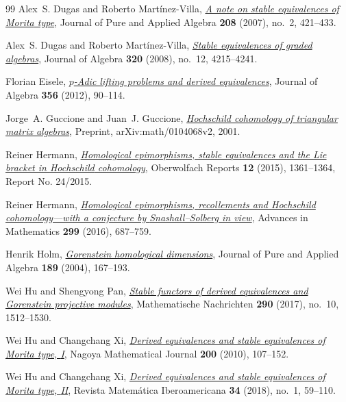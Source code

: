 \documentclass[12pt,a4paper,english,reqno]{amsart}
\numberwithin{equation}{section}
\theoremstyle{plain}
\theoremstyle{definition}
\begin{document}
\begin{thebibliography}{99}
Alex~S. Dugas and Roberto Mart{\'i}nez-Villa,
  \emph{\href{https://doi.org/10.1016/j.jpaa.2006.01.007}{A note on stable
  equivalences of {Morita} type}}, Journal of Pure and Applied Algebra
  \textbf{208} (2007), no.~2, 421--433.

Alex~S. Dugas and Roberto Mart{\'i}nez-Villa,
  \emph{\href{https://doi.org/10.1016/j.jalgebra.2008.09.014}{Stable
  equivalences of graded algebras}}, Journal of Algebra \textbf{320} (2008),
  no.~12, 4215--4241.

Florian Eisele,
  \emph{\href{https://doi.org/10.1016/j.jalgebra.2012.01.015}
  {$p$-Adic lifting problems and derived equivalences}},
  Journal of Algebra \textbf{356} (2012), 90--114.

Jorge~A. Guccione and Juan~J. Guccione,
  \emph{\href{https://arxiv.org/abs/math/0104068}{Hochschild cohomology of
  triangular matrix algebras}}, Preprint, arXiv:math/0104068v2, 2001.

Reiner Hermann, \emph{\href{https://doi.org/10.4171/OWR/2015/24}{Homological
  epimorphisms, stable equivalences and the {Lie} bracket in {Hochschild}
  cohomology}}, Oberwolfach Reports \textbf{12} (2015), 1361--1364, Report No.
  24/2015.

Reiner Hermann, \emph{\href{https://doi.org/10.1016/j.aim.2016.05.022}{Homological
  epimorphisms, recollements and {Hochschild} cohomology---with a conjecture by
  {Snashall--Solberg} in view}}, Advances in Mathematics \textbf{299} (2016),
  687--759.

Henrik Holm, \emph{\href{https://doi.org/10.1016/j.jpaa.2003.11.007}{Gorenstein
  homological dimensions}}, Journal of Pure and Applied Algebra \textbf{189}
  (2004), 167--193.

Wei Hu and Shengyong Pan,
  \emph{\href{https://doi.org/10.1002/mana.201600179}{Stable functors of
  derived equivalences and {Gorenstein} projective modules}}, Mathematische
  Nachrichten \textbf{290} (2017), no.~10, 1512--1530.

Wei Hu and Changchang Xi,
  \emph{\href{https://doi.org/10.1215/00277630-2010-014}{Derived equivalences
  and stable equivalences of {Morita} type, {I}}}, Nagoya Mathematical Journal
  \textbf{200} (2010), 107--152.

Wei Hu and Changchang Xi, \emph{\href{https://doi.org/10.4171/RMI/981}{Derived
  equivalences and stable equivalences of {Morita} type, {II}}}, Revista
  Matem{\'a}tica Iberoamericana \textbf{34} (2018), no.~1, 59--110.


\end{thebibliography}
\end{document}

